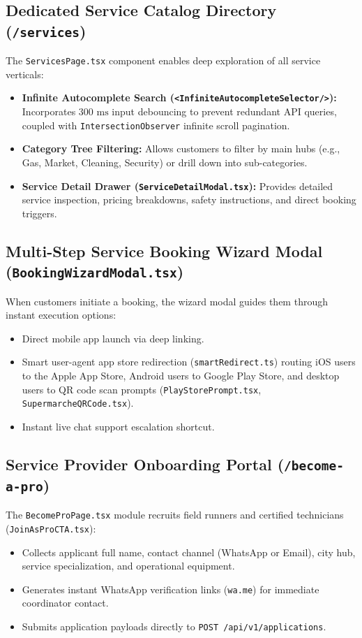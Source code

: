 \documentclass[11pt,a4paper]{article}
\begin{document}
\subsection{Dedicated Service Catalog Directory (\texttt{/services})}
The \texttt{ServicesPage.tsx} component enables deep exploration of all service verticals:
\begin{itemize}
    \item \textbf{Infinite Autocomplete Search (\texttt{<InfiniteAutocompleteSelector/>}):} Incorporates $300\text{ ms}$ input debouncing to prevent redundant API queries, coupled with \texttt{IntersectionObserver} infinite scroll pagination.
    \item \textbf{Category Tree Filtering:} Allows customers to filter by main hubs (e.g., Gas, Market, Cleaning, Security) or drill down into sub-categories.
    \item \textbf{Service Detail Drawer (\texttt{ServiceDetailModal.tsx}):} Provides detailed service inspection, pricing breakdowns, safety instructions, and direct booking triggers.
\end{itemize}

\subsection{Multi-Step Service Booking Wizard Modal (\texttt{BookingWizardModal.tsx})}
When customers initiate a booking, the wizard modal guides them through instant execution options:
\begin{itemize}
    \item Direct mobile app launch via deep linking.
    \item Smart user-agent app store redirection (\texttt{smartRedirect.ts}) routing iOS users to the Apple App Store, Android users to Google Play Store, and desktop users to QR code scan prompts (\texttt{PlayStorePrompt.tsx}, \texttt{SupermarcheQRCode.tsx}).
    \item Instant live chat support escalation shortcut.
\end{itemize}

\subsection{Service Provider Onboarding Portal (\texttt{/become-a-pro})}
The \texttt{BecomeProPage.tsx} module recruits field runners and certified technicians (\texttt{JoinAsProCTA.tsx}):
\begin{itemize}
    \item Collects applicant full name, contact channel (WhatsApp or Email), city hub, service specialization, and operational equipment.
    \item Generates instant WhatsApp verification links (\texttt{wa.me}) for immediate coordinator contact.
    \item Submits application payloads directly to \texttt{POST /api/v1/applications}.
\end{itemize}
\end{document}
